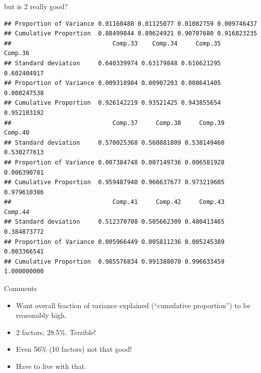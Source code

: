 \begin{frame}[fragile]{but is 2 really good?}
{\begin{knitrout}
\begin{kframe}
\begin{verbatim}
## Proportion of Variance 0.01160488 0.01125077 0.01082759 0.009746437
## Cumulative Proportion  0.88499844 0.89624921 0.90707680 0.916823235
##                            Comp.33    Comp.34     Comp.35     Comp.36
## Standard deviation     0.640339974 0.63179848 0.616621295 0.602404917
## Proportion of Variance 0.009318984 0.00907203 0.008641405 0.008247538
## Cumulative Proportion  0.926142219 0.93521425 0.943855654 0.952103192
##                            Comp.37     Comp.38     Comp.39     Comp.40
## Standard deviation     0.570025368 0.560881809 0.538149460 0.530277613
## Proportion of Variance 0.007384748 0.007149736 0.006581928 0.006390781
## Cumulative Proportion  0.959487940 0.966637677 0.973219605 0.979610386
##                            Comp.41     Comp.42     Comp.43     Comp.44
## Standard deviation     0.512370708 0.505662309 0.480413465 0.384873772
## Proportion of Variance 0.005966449 0.005811236 0.005245389 0.003366541
## Cumulative Proportion  0.985576834 0.991388070 0.996633459 1.000000000
\end{verbatim}
\end{kframe}
\end{knitrout}
}

\end{frame}

\begin{frame}[fragile]{Comments}

  \begin{itemize}
\item Want overall fraction of variance explained (``cumulative
  proportion'') to be reasonably high.
\item 2 factors, 28.5\%. Terrible!
\item Even 56\% (10 factors) not that good!
\item Have to live with that.
\end{itemize}

\end{frame}

